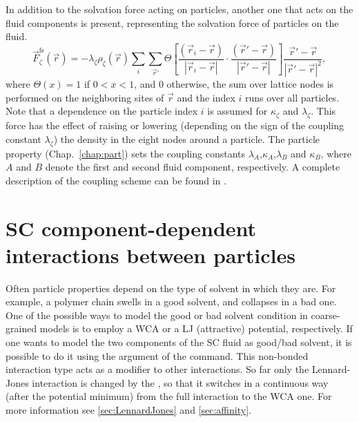 In addition to the solvation force acting on particles, another one
that acts on the fluid components is present, representing the
solvation force of particles on the fluid.
\begin{equation}
  \vec{F}_{\zeta}^{\mathrm{fs}}(\vec{r}) = -\lambda_{\zeta} \rho_{\zeta}(\vec{r}) \sum_i \sum_{\vec{r}'} \Theta \left[\frac{(\vec{r}_i-\vec{r})}{|\vec{r}_i-\vec{r}|} \cdot \frac{(\vec{r}'-\vec{r})}{|\vec{r}'-\vec{r}|} \right] \frac{\vec{r}'-\vec{r}}{|\vec{r}'-\vec{r}|^2},
\end{equation}
where $\Theta(x)=1$ if $0<x<1$, and 0 otherwise, the sum over lattice
nodes is performed on the neighboring sites of $\vec{r}$ and the index
$i$ runs over all particles. Note that a dependence on the particle
index $i$ is assumed for $\kappa_\zeta$ and $\lambda_\zeta$.  This
force has the effect of raising or lowering (depending on the sign of
the coupling constant $\lambda_\zeta$) the density in the eight nodes
around a particle.  The particle property 
(Chap.~\ref{chap:part}) sets the coupling constants
$\lambda_A$,$\kappa_A$,$\lambda_B$ and $\kappa_B$, where $A$ and $B$
denote the first and second fluid component, respectively.  A complete
description of the coupling scheme can be found in \cite{sega13c}.

\section{SC component-dependent interactions between particles}
\label{sec:scmd-affinity}

Often particle properties depend on the type of solvent in which they
are. For example, a polymer chain swells in a good solvent, and
collapses in a bad one. One of the possible ways to model the good or
bad solvent condition in coarse-grained models is to employ a WCA or a
LJ (attractive) potential, respectively. If one wants to model the two
components of the SC fluid as good/bad solvent, it is possible to do
it using the  argument of the  command. This
non-bonded interaction type acts as a modifier to other
interactions. So far only the Lennard-Jones interaction is changed by
the , so that it switches in a continuous way (after the
potential minimum) from the full interaction to the WCA one. For more
information see \ref{sec:LennardJones} and \ref{sec:affinity}.

